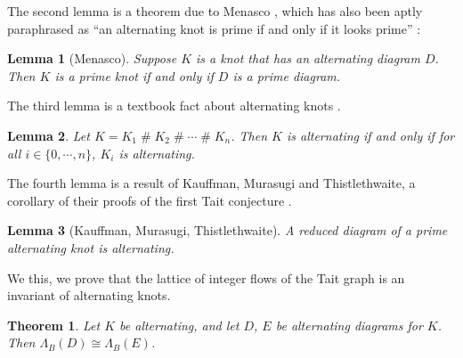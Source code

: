 \documentclass[12pt]{report}
\newcommand{\hash}{\ensuremath{\mathbin{\#}}}
\newtheorem*{theorem}{Theorem}
\newtheorem*{lemma}{Lemma}
\begin{document}
The second lemma is a theorem due to Menasco \cite{closed-incompressible-surfaces}, which has also been aptly paraphrased as ``an alternating knot is prime if and only if it looks prime'' \cite{the-first-two-million-knots}:

\begin{lemma}[Menasco]
	Suppose $K$ is a knot that has an alternating diagram $D$. Then $K$ is a prime knot if and only if $D$ is a prime diagram.
\end{lemma}

The third lemma is a textbook fact about alternating knots \cite{introduction-knot-theory}.

\begin{lemma}
	Let $K = K_{1} \hash K_{2} \hash \cdots \hash K_{n}$. Then $K$ is alternating if and only if for all $i \in \{0, \cdots, n\}$, $K_{i}$ is alternating.
\end{lemma}

The fourth lemma is a result of Kauffman, Murasugi and Thistlethwaite, a corollary of their proofs of the first Tait conjecture \cite{state-models-jones-polynomial, jones-polynomials-classical-conjectures, spanning-tree-expansion-jones-polynomial}.

\begin{lemma}[Kauffman, Murasugi, Thistlethwaite]
	A reduced diagram of a prime alternating knot is alternating.
\end{lemma}

We this, we prove that the lattice of integer flows of the Tait graph is an invariant of alternating knots.

\begin{theorem}
	Let $K$ be alternating, and let $D$, $E$ be alternating diagrams for $K$. Then $\Lambda_{B}(D) \cong \Lambda_{B}(E)$.
\end{theorem}
\end{document}
